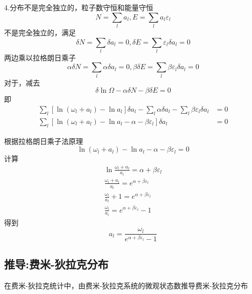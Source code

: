 4.分布不是完全独立的，粒子数守恒和能量守恒
\begin{equation}
    N=\sum_l{a_l},E=\sum_l{a_l\varepsilon _l}
\end{equation}
不是完全独立的，满足
\begin{equation}
    \delta N=\sum_l{\delta a_l}=0,\delta E=\sum_l{\varepsilon _l\delta a_l}=0
\end{equation}
两边乘以拉格朗日乘子
\begin{equation}
    \alpha \delta N=\sum_l{\alpha \delta a_l}=0,\beta \delta E=\sum_l{\beta \varepsilon _l\delta a_l}=0
\end{equation}
对于，减去
\begin{equation}
    \delta \ln \Omega -\alpha \delta N-\beta \delta E=0
\end{equation}
即
\begin{equation}
    \begin{aligned}
        \sum_l{\left[ \ln \left( \omega _l+a_l \right) -\ln a_l \right] \delta a_l}-\sum_l{\alpha \delta a_l}-\sum_l{\beta \varepsilon _l\delta a_l}&=0
\\
\sum_l{\left[ \ln \left( \omega _l+a_l \right) -\ln a_l-\alpha -\beta \varepsilon _l \right] \delta a_l}&=0
    \end{aligned}
\end{equation}

根据拉格朗日乘子法原理
\begin{equation}
    \ln \left( \omega _l+a_l \right) -\ln a_l-\alpha -\beta \varepsilon _l=0
\end{equation}
计算
\begin{equation}
    \begin{aligned}
        \ln \frac{\omega _l+a_l}{a_l}=\alpha +\beta \varepsilon _l
\\
\frac{\omega _l+a_l}{a_l}=e^{\alpha +\beta \varepsilon _l}
\\
\frac{\omega _l}{a_l}+1=e^{\alpha +\beta \varepsilon _l}
\\
\frac{\omega _l}{a_l}=e^{\alpha +\beta \varepsilon _l}-1
    \end{aligned}
\end{equation}
得到
\begin{equation}
    a_l=\frac{\omega _l}{e^{\alpha +\beta \varepsilon _l}-1}
\end{equation}

\newpage
\subsection{推导:费米-狄拉克分布}
在费米-狄拉克统计中，由费米-狄拉克系统的微观状态数推导费米-狄拉克分布

